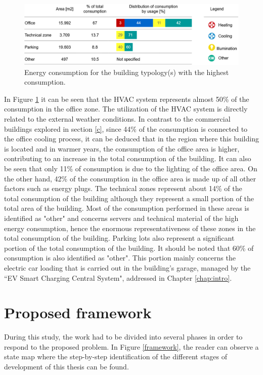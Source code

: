 \begin{figure}[h!]
    \centering
    \begin{center}
    \includegraphics[width=1\textwidth]{Images/ConsumoEDP.png}
    \caption{Energy consumption for the building typology(s) with the highest consumption.}
    \label{consedp}
    \end{center}
\end{figure}
In Figure \ref{consedp} it can be seen that the \ac{HVAC} system represents almost 50\% of the consumption in the office zone. The utilization of the \ac{HVAC} system is directly related to the external weather conditions. In contrast to the commercial buildings explored in section \ref{c}, since 44\% of the consumption is connected to the office cooling process, it can be deduced that in the region where this building is located and in warmer years, the consumption of the office area is higher, contributing to an increase in the total consumption of the building. It can also be seen that only 11\% of consumption is due to the lighting of the office area. On the other hand, 42\% of the consumption in the office area is made up of all other factors such as energy plugs. The technical zones represent about 14\% of the total consumption of the building although they represent a small portion of the total area of the building. Most of the consumption performed in these areas is identified as "other" and concerns servers and technical material of the high energy consumption, hence the enormous representativeness of these zones in the total consumption of the building. Parking lots also represent a significant portion of the total consumption of the building. It should be noted that 60\% of consumption is also identified as "other". This portion mainly concerns the electric car loading that is carried out in the building's garage, managed by the “\ac{EV} Smart Charging Central System", addressed in Chapter \ref{chap:intro}.

\section{Proposed framework}\label{propfram}
During this study, the work had to be divided into several phases in order to respond to the proposed problem. In Figure \ref{framework}, the reader can observe a state map where the step-by-step identification of the different stages of development of this thesis can be found.

